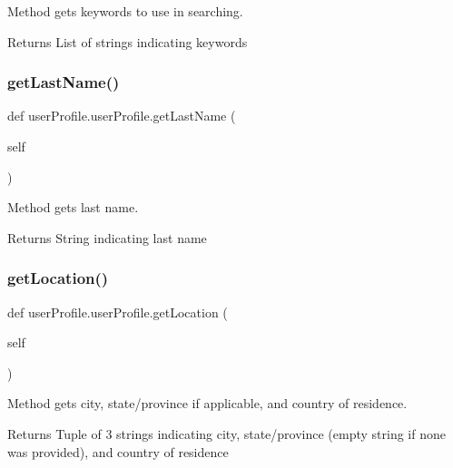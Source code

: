 Method gets keywords to use in searching. 

\begin{DoxyReturn}{Returns}
List of strings indicating keywords 
\end{DoxyReturn}
\mbox{\label{classuserProfile_1_1userProfile_acb6d2593a392756816a448e09bdc1b24}} 
\subsubsection{\texorpdfstring{get\+Last\+Name()}{getLastName()}}
{\footnotesize\ttfamily def user\+Profile.\+user\+Profile.\+get\+Last\+Name (\begin{DoxyParamCaption}\item[{}]{self }\end{DoxyParamCaption})}



Method gets last name. 

\begin{DoxyReturn}{Returns}
String indicating last name 
\end{DoxyReturn}
\mbox{\label{classuserProfile_1_1userProfile_a50577f0100db886c2c5d6cdfc61c73a6}} 
\subsubsection{\texorpdfstring{get\+Location()}{getLocation()}}
{\footnotesize\ttfamily def user\+Profile.\+user\+Profile.\+get\+Location (\begin{DoxyParamCaption}\item[{}]{self }\end{DoxyParamCaption})}



Method gets city, state/province if applicable, and country of residence. 

\begin{DoxyReturn}{Returns}
Tuple of 3 strings indicating city, state/province (empty string if none was provided), and country of residence 
\end{DoxyReturn}
\mbox{\label{classuserProfile_1_1userProfile_aa146aa6eba2de13cfcff77e14409b891}} 
